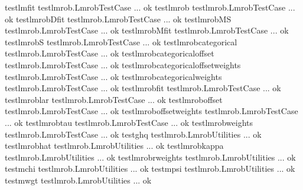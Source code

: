 \documentclass[letterpaper,10pt,english]{sphinxmanual}
\begin{document}
\begin{enumerate}
\begin{description}
%
\begin{sphinxVerbatim}[commandchars=\\\{\}]
test\PYGZus{}lm\PYGZus{}fit test\PYGZus{}lmrob.LmrobTestCase ... ok
test\PYGZus{}lmrob test\PYGZus{}lmrob.LmrobTestCase ... ok
test\PYGZus{}lmrob\PYGZus{}D\PYGZus{}fit test\PYGZus{}lmrob.LmrobTestCase ... ok
test\PYGZus{}lmrob\PYGZus{}M\PYGZus{}S test\PYGZus{}lmrob.LmrobTestCase ... ok
test\PYGZus{}lmrob\PYGZus{}M\PYGZus{}fit test\PYGZus{}lmrob.LmrobTestCase ... ok
test\PYGZus{}lmrob\PYGZus{}S test\PYGZus{}lmrob.LmrobTestCase ... ok
test\PYGZus{}lmrob\PYGZus{}categorical test\PYGZus{}lmrob.LmrobTestCase ... ok
test\PYGZus{}lmrob\PYGZus{}categorical\PYGZus{}offset test\PYGZus{}lmrob.LmrobTestCase ... ok
test\PYGZus{}lmrob\PYGZus{}categorical\PYGZus{}offset\PYGZus{}weights test\PYGZus{}lmrob.LmrobTestCase ... ok
test\PYGZus{}lmrob\PYGZus{}categorical\PYGZus{}weights test\PYGZus{}lmrob.LmrobTestCase ... ok
test\PYGZus{}lmrob\PYGZus{}fit test\PYGZus{}lmrob.LmrobTestCase ... ok
test\PYGZus{}lmrob\PYGZus{}lar test\PYGZus{}lmrob.LmrobTestCase ... ok
test\PYGZus{}lmrob\PYGZus{}offset test\PYGZus{}lmrob.LmrobTestCase ... ok
test\PYGZus{}lmrob\PYGZus{}offset\PYGZus{}weights test\PYGZus{}lmrob.LmrobTestCase ... ok
test\PYGZus{}lmrob\PYGZus{}tau test\PYGZus{}lmrob.LmrobTestCase ... ok
test\PYGZus{}lmrob\PYGZus{}weights test\PYGZus{}lmrob.LmrobTestCase ... ok
test\PYGZus{}ghq test\PYGZus{}lmrob.LmrobUtilities ... ok
test\PYGZus{}lmrob\PYGZus{}hat test\PYGZus{}lmrob.LmrobUtilities ... ok
test\PYGZus{}lmrob\PYGZus{}kappa test\PYGZus{}lmrob.LmrobUtilities ... ok
test\PYGZus{}lmrob\PYGZus{}rweights test\PYGZus{}lmrob.LmrobUtilities ... ok
test\PYGZus{}mchi test\PYGZus{}lmrob.LmrobUtilities ... ok
test\PYGZus{}mpsi test\PYGZus{}lmrob.LmrobUtilities ... ok
test\PYGZus{}mwgt test\PYGZus{}lmrob.LmrobUtilities ... ok
\end{sphinxVerbatim}

\end{description}

\end{enumerate}
\end{document}
